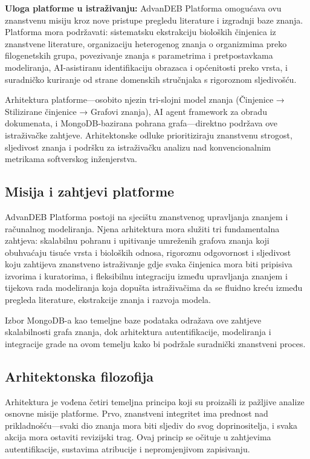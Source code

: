 \documentclass[12pt,a4paper]{article}
\begin{document}
\textbf{Uloga platforme u istraživanju:} AdvanDEB Platforma omogućava ovu znanstvenu misiju kroz nove pristupe pregledu literature i izgradnji baze znanja. Platforma mora podržavati: sistematsku ekstrakciju bioloških činjenica iz znanstvene literature, organizaciju heterogenog znanja o organizmima preko filogenetskih grupa, povezivanje znanja s parametrima i pretpostavkama modeliranja, AI-asistiranu identifikaciju obrazaca i općenitosti preko vrsta, i suradničko kuriranje od strane domenskih stručnjaka s rigoroznom sljedivošću.

Arhitektura platforme—osobito njezin tri-slojni model znanja (Činjenice → Stilizirane činjenice → Grafovi znanja), AI agent framework za obradu dokumenata, i MongoDB-bazirana pohrana grafa—direktno podržava ove istraživačke zahtjeve. Arhitektonske odluke prioritiziraju znanstvenu strogost, sljedivost znanja i podršku za istraživačku analizu nad konvencionalnim metrikama softverskog inženjerstva.

\subsection{Misija i zahtjevi platforme}

AdvanDEB Platforma postoji na sjecištu znanstvenog upravljanja znanjem i računalnog modeliranja. Njena arhitektura mora služiti tri fundamentalna zahtjeva: skalabilnu pohranu i upitivanje umreženih grafova znanja koji obuhvaćaju tisuće vrsta i bioloških odnosa, rigoroznu odgovornost i sljedivost koju zahtijeva znanstveno istraživanje gdje svaka činjenica mora biti pripisiva izvorima i kuratorima, i fleksibilnu integraciju između upravljanja znanjem i tijekova rada modeliranja koja dopušta istraživačima da se fluidno kreću između pregleda literature, ekstrakcije znanja i razvoja modela.

Izbor MongoDB-a kao temeljne baze podataka odražava ove zahtjeve skalabilnosti grafa znanja, dok arhitektura autentifikacije, modeliranja i integracije grade na ovom temelju kako bi podržale suradnički znanstveni proces.

\subsection{Arhitektonska filozofija}

Arhitektura je vođena četiri temeljna principa koji su proizašli iz pažljive analize osnovne misije platforme. Prvo, znanstveni integritet ima prednost nad prikladnošću—svaki dio znanja mora biti sljediv do svog doprinositelja, i svaka akcija mora ostaviti revizijski trag. Ovaj princip se očituje u zahtjevima autentifikacije, sustavima atribucije i nepromjenjivom zapisivanju.
\end{document}
